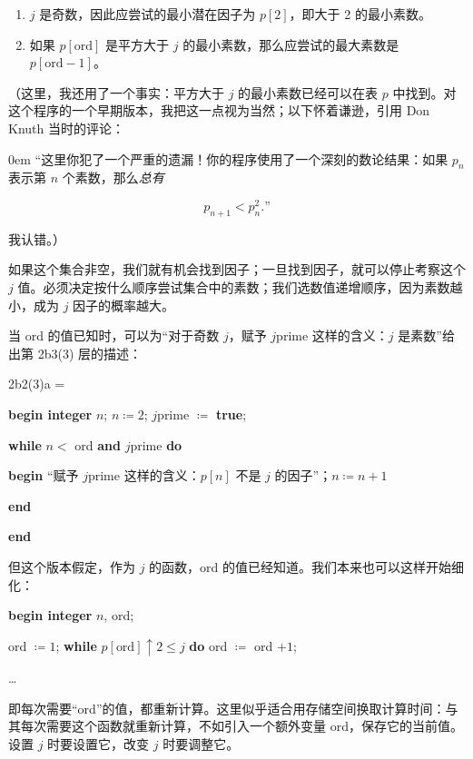 \begin{enumerate}[wide, nosep, label=(\arabic*)]
	\item $j$ 是奇数，因此应尝试的最小潜在因子为 $p[2]$，即大于 2 的最小素数。

	\item 如果 $p[\text{ord}]$ 是平方大于 $j$ 的最小素数，那么应尝试的最大素数是 $p[\text{ord} - 1]$。
\end{enumerate}

（这里，我还用了一个事实：平方大于 $j$ 的最小素数已经可以在表 $p$ 中找到。对这个程序的一个早期版本，我把这一点视为当然；以下怀着谦逊，引用 Don Knuth 当时的评论：

\begin{addmargin}[\parindent]{0em}
“这里你犯了一个严重的遗漏！你的程序使用了一个深刻的数论结果：如果 $p_n$ 表示第 $n$ 个素数，那么\textit{总有}
\end{addmargin}
$$
p_{n+1}<p_n^2.\text{”}
$$

\noindent
我认错。）

如果这个集合非空，我们就有机会找到因子；一旦找到因子，就可以停止考察这个 $j$ 值。必须决定按什么顺序尝试集合中的素数；我们选数值递增顺序，因为素数越小，成为 $j$ 因子的概率越大。

当 ord 的值已知时，可以为“对于奇数 $j$，赋予 $j$prime 这样的含义：$j$ 是素数”给出第 2b3(3) 层的描述：

\noindent
2b2(3)a =

\noindent
\textbf{begin integer} $n$; $n \coloneq 2$; $j$prime $\coloneq$ \textbf{true};

\noindent
\quad\textbf{while} $n <$ ord \textbf{and} $j$prime \textbf{do}

\noindent
\quad\textbf{begin} “赋予 $j$prime 这样的含义：$p[n]$ 不是 $j$ 的因子”；$n \coloneq n + 1$

\noindent
\quad\textbf{end}

\noindent
\textbf{end}

但这个版本假定，作为 $j$ 的函数，ord 的值已经知道。我们本来也可以这样开始细化：

\noindent
\textbf{begin integer} $n$, ord;

\noindent
\quad ord $\coloneq 1$; \textbf{while} $p[\text{ord}] \uparrow 2 \leqslant j$ \textbf{do} ord $\coloneq$ ord $+ 1$;

\noindent
\quad \dots

\noindent
即每次需要“ord”的值，都重新计算。这里似乎适合用存储空间换取计算时间：与其每次需要这个函数就重新计算，不如引入一个额外变量 ord，保存它的当前值。设置 $j$ 时要设置它，改变 $j$ 时要调整它。

